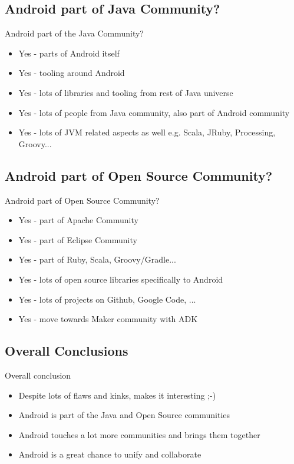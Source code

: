 \documentclass[aspectratio=169]{beamer}
\begin{document}
  \subsection{Android part of Java Community?}
    \begin{frame}{Android part of the Java Community?}
     \begin{itemize}
      \item<1-> Yes - parts of Android itself
      \item<2-> Yes - tooling around Android
      \item<3-> Yes - lots of libraries and tooling from rest of Java universe
      \item<4-> Yes - lots of people from Java community, also part of Android community
      \item<5-> Yes - lots of JVM related aspects as well e.g. Scala, JRuby, Processing, Groovy...
      \end{itemize}
    \end{frame}
  
  \subsection{Android part of Open Source Community?}
    \begin{frame}{Android part of Open Source Community?}
     \begin{itemize}
      \item<1-> Yes - part of Apache Community
      \item<2-> Yes - part of Eclipse Community
      \item<3-> Yes - part of Ruby, Scala, Groovy/Gradle...
      \item<4-> Yes - lots of open source libraries specifically to Android
      \item<5-> Yes - lots of projects on Github, Google Code, ...
      \item<6-> Yes - move towards Maker community with ADK
     \end{itemize}
    \end{frame}

  \subsection{Overall Conclusions}
    \begin{frame}{Overall conclusion}
      \begin{itemize}
        \item<1-> Despite lots of flaws and kinks, makes it interesting ;-)
        \item<2-> Android is part of the Java and Open Source communities
        \item<3-> Android touches a lot more communities and brings them together
        \item<4-> Android is a great chance to unify and collaborate 
      \end{itemize}
    \end{frame}
\end{document}
